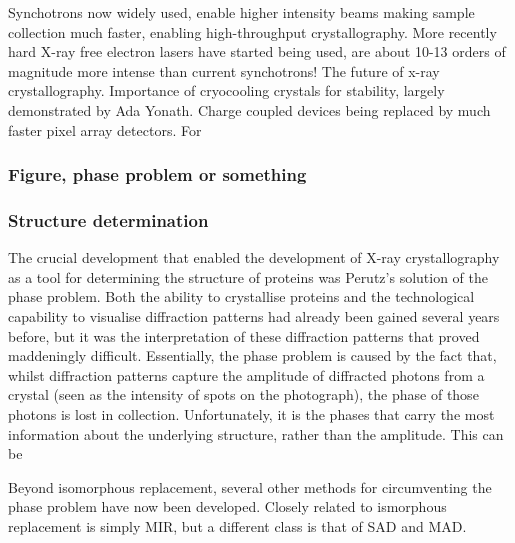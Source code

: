 \documentclass[a4paper,11pt,twoside,openright]{scrbook}
\begin{document}
Synchotrons now widely used, enable higher intensity beams making sample collection much faster, enabling high-throughput crystallography. More recently hard X-ray free electron lasers have started being used, are about 10-13 orders of magnitude more intense than current synchotrons! The future of x-ray crystallography. Importance of cryocooling crystals for stability, largely demonstrated by Ada Yonath. Charge coupled devices being replaced by much faster pixel array detectors. For



\subsubsection{Figure, phase problem or something}

\subsubsection{Structure determination}
The crucial development that enabled the development of X-ray crystallography as a tool for determining the structure of proteins was Perutz's solution of the phase problem. Both the ability to crystallise proteins and the technological capability to visualise diffraction patterns had already been gained several years before, but it was the interpretation of these diffraction patterns that proved maddeningly difficult. Essentially, the phase problem is caused by the fact that, whilst diffraction patterns capture the amplitude of diffracted photons from a crystal (seen as the intensity of spots on the photograph), the phase of those photons is lost in collection. Unfortunately, it is the phases that carry the most information about the underlying structure, rather than the amplitude. This can be

Beyond isomorphous replacement, several other methods for circumventing the phase problem have now been developed. Closely related to ismorphous replacement is simply MIR, but a different class is that of SAD and MAD.
\end{document}

